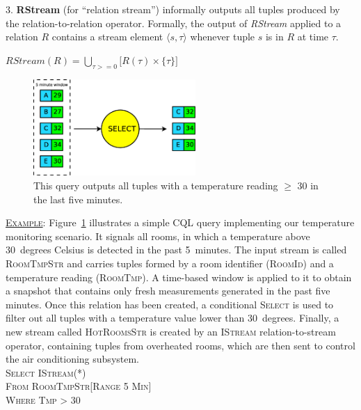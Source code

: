 3. \textbf{RStream} (for ``relation stream'') informally outputs all tuples produced by the
relation-to-relation operator. Formally, the output of \textit{RStream} applied to a relation $R$
contains a stream element $\langle s, \tau \rangle$ whenever tuple $s$ is in $R$ at time $\tau$.

\begin{center}
	$RStream(R) = \bigcup_{\tau>=0}\Big[R(\tau)\times\{\tau\}\Big]$ %
\end{center}	

\begin{figure}[b]
	\centering
	\includegraphics[width=0.55\textwidth]{img/tesi/cql-example} %
	\caption{This query outputs all tuples with a temperature reading $\geq$ 30 in the last five minutes.}
	\label{fig:cql-example}
\end{figure}
\vspace{15pt}
\underline{\textsc{Example}}: Figure~\ref{fig:cql-example} illustrates a simple CQL query implementing
our temperature monitoring scenario. It signals all rooms, in which a temperature above 30~degrees
Celsius is detected in the past 5~minutes. The input stream is called \textsc{RoomTmpStr} and carries
tuples formed by a room identifier (\textsc{RoomId}) and a temperature reading (\textsc{RoomTmp}). A time-based window
is applied to it to obtain a snapshot that contains only fresh measurements generated in the past five
minutes. Once this relation has been created, a conditional \textsc{Select} is used to filter
out all tuples with a temperature value lower than 30~degrees. Finally, a new stream called
\textsc{HotRoomsStr} is created by an \textsc{IStream} relation-to-stream operator, containing tuples
from overheated rooms, which are then sent to control the air conditioning subsystem.\\
\tab \textsc{Select IStream(*)} \\
\tab \textsc{From RoomTmpStr[Range 5 Min]} \\
\tab \textsc{Where Tmp > 30} \\
\vspace{-25pt}
